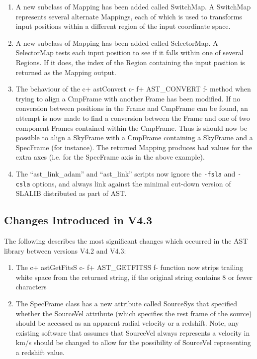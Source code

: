 \documentclass[twoside,11pt]{article}
\begin{document}
\begin{enumerate}
\item A new subclass of Mapping has been added called SwitchMap. A
SwitchMap represents several alternate Mappings, each of which is used to
transforms input positions within a different region of the input
coordinate space.

\item A new subclass of Mapping has been added called SelectorMap. A
SelectorMap tests each input position to see if it falls within one of
several Regions. If it does, the index of the Region containing the
input position is returned as the Mapping output.

\item The behaviour of the
c+
astConvert
c-
f+
AST\_CONVERT
f-
method when trying to align a CmpFrame with another Frame has been
modified. If no conversion between positions in the Frame and CmpFrame
can be found, an attempt is now made to find a conversion between the
Frame and one of two component Frames contained within the CmpFrame. Thus
is should now be possible to align a SkyFrame with a CmpFrame containing a
SkyFrame and a SpecFrame (for instance). The returned Mapping produces bad
values for the extra axes (i.e. for the SpecFrame axis in the above example).

\item The ``ast\_link\_adam'' and ``ast\_link'' scripts now ignore the
\verb+-fsla+ and \verb+-csla+ options, and always link against the
minimal cut-down version of SLALIB distributed as part of AST.

\end{enumerate}

\subsection{Changes Introduced in V4.3}

The following describes the most significant changes which occurred in the
AST library between versions V4.2 and V4.3:

\begin{enumerate}

\item The
c+
astGetFitsS
c-
f+
AST\_GETFITSS
f-
function now strips trailing white space from the returned string, if the
original string contains 8 or fewer characters

\item The SpecFrame class has a new attribute called SourceSys that specified
whether the SourceVel attribute (which specifies the rest frame of the
source) should be accessed as an apparent radial velocity or a redshift.
Note, any existing software that assumes that SourceVel always represents
a velocity in km/s should be changed to allow for the possibility of
SourceVel representing a redshift value.

\end{enumerate}
\end{document}
